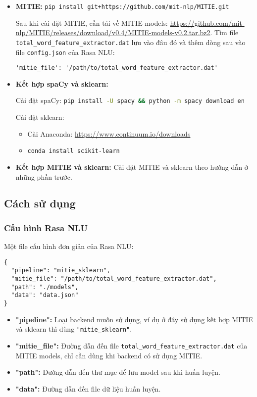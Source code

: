 \begin{itemize}
    \item \textbf{MITIE:} \lstinline[language=bash]{pip install git+https://github.com/mit-nlp/MITIE.git}
    
    Sau khi cài đặt MITIE, cần tải về MITIE models: \url{https://github.com/mit-nlp/MITIE/releases/download/v0.4/MITIE-models-v0.2.tar.bz2}. Tìm file \lstinline{total_word_feature_extractor.dat} lưu vào đâu đó và thêm dòng sau vào file \lstinline{config.json} của Rasa NLU:
    
    \lstinline{'mitie_file': '/path/to/total_word_feature_extractor.dat'}
    
    \item \textbf{Kết hợp spaCy và sklearn:}
    
    Cài đặt spaCy: \lstinline[language=bash]{pip install -U spacy && python -m spacy download en}
    
    Cài đặt sklearn:
    
    \begin{itemize}
        \item Cài Anaconda: \url{https://www.continuum.io/downloads}
        \item \lstinline[language=bash]{conda install scikit-learn}
    \end{itemize}
    
    \item \textbf{Kết hợp MITIE và sklearn:} Cài đặt MITIE và sklearn theo hướng dẫn ở những phần trước.
\end{itemize}

\subsection{Cách sử dụng}

\subsubsection{Cấu hình Rasa NLU}

Một file cấu hình đơn giản của Rasa NLU:

\begin{lstlisting}[title=config.json]
{
  "pipeline": "mitie_sklearn",
  "mitie_file": "/path/to/total_word_feature_extractor.dat",
  "path": "./models",
  "data": "data.json"
}
\end{lstlisting}

\begin{itemize}
    \item \textbf{"pipeline":} Loại backend muốn sử dụng, ví dụ ở đây sử dụng kết hợp MITIE và sklearn thì dùng \lstinline{"mitie_sklearn"}.
    \item \textbf{"mitie\_file":} Đường dẫn đến file \lstinline{total_word_feature_extractor.dat} của MITIE models, chỉ cần dùng khi backend có sử dụng MITIE.
    \item \textbf{"path":} Đường dẫn đến thư mục để lưu model sau khi huấn luyện.
    \item \textbf{"data":} Đường dẫn đến file dữ liệu huấn luyện.
\end{itemize}

